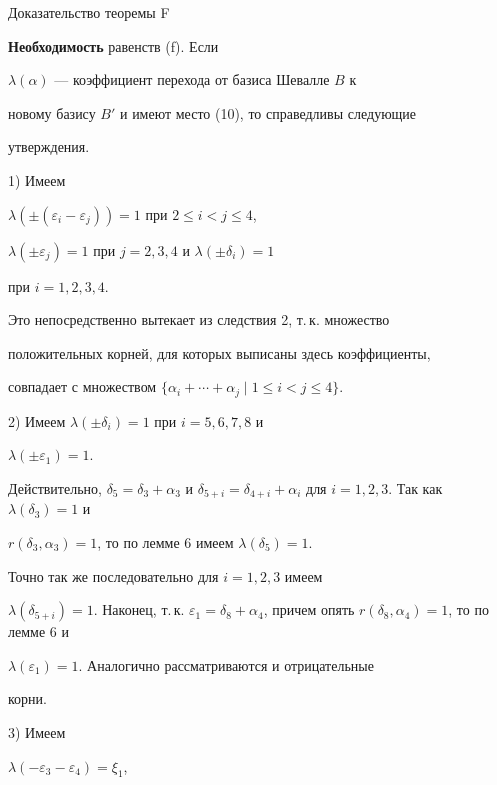 \begin{pf*}{Доказательство теоремы F}


{\bf Необходимость} равенств (f). Если


$\lambda(\alpha)$ --- коэффициент перехода от базиса Шевалле $B$ к


новому базису $B'$ и имеют место (10), то справедливы следующие


утверждения.





1) Имеем


$\lambda(\pm(\varepsilon_i-\varepsilon_j))=1$ при $2\le i<j\le4$,


$\lambda(\pm\varepsilon_j)=1$ при $j=2,3,4$ и $\lambda(\pm\delta_i)=1$


при $i=1,2,3,4$.





Это непосредственно вытекает из следствия 2, т.\,к. множество


положительных корней, для которых выписаны здесь коэффициенты,


совпадает с множеством $\{\alpha_i+\dotsb+\alpha_j\mid 1\le i<j\le4\}$.





2) Имеем $\lambda(\pm\delta_i)=1$ при $i=5,6,7,8$ и


$\lambda(\pm\varepsilon_1)=1$.





Действительно, $\delta_5=\delta_3+\alpha_3$ и $\delta_{5+i}


=\delta_{4+i}+\alpha_i$ для $i=1,2,3$. Так как $\lambda(\delta_3)=1$ и


$r(\delta_3,\alpha_3)=1$, то по лемме 6 имеем $\lambda(\delta_5)=1$.


Точно так же последовательно для $i=1,2,3$ имеем


$\lambda(\delta_{5+i})=1$. Наконец, т.\,к. $\varepsilon_1=\delta_8+


\alpha_4$, причем опять $r(\delta_8,\alpha_4)=1$, то по лемме 6 и


$\lambda(\varepsilon_1)=1$. Аналогично рассматриваются и отрицательные


корни.





3) Имеем


$\lambda(-\varepsilon_3-\varepsilon_4)=\xi_1$,



\end{pf*}
